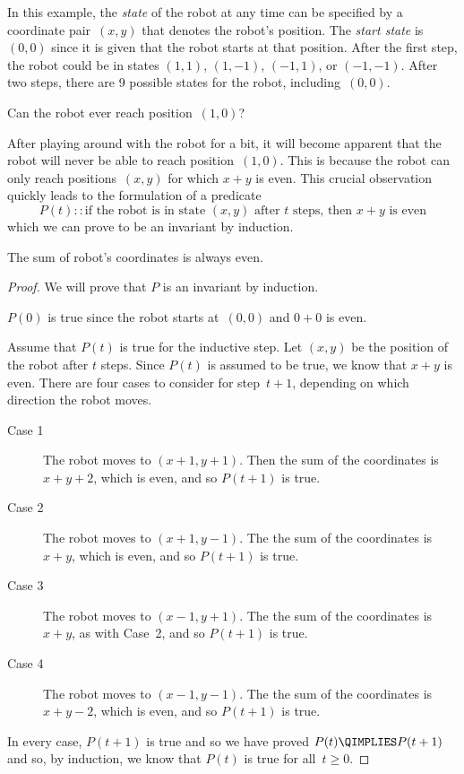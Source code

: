 In this example, the \emph{state} of the robot at any time can be
specified by a coordinate pair~$(x, y)$ that denotes the robot's
position.  The \emph{start state} is~$(0, 0)$ since it is given that
the robot starts at that position.  After the first step, the robot
could be in states $(1, 1)$, $(1, -1)$, $(-1, 1)$, or $(-1, -1)$.
After two steps, there are 9 possible states for the robot,
including~$(0, 0)$.

Can the robot ever reach position~$(1, 0)$?

After playing around with the robot for a bit, it will become apparent
that the robot will never be able to reach position~$(1, 0)$.  This is
because the robot can only reach positions~$(x, y)$ for which $x + y$
is even.  This crucial observation quickly leads to the formulation of
a predicate
\begin{equation*}
    P(t) :: \text{if the robot is in state $(x, y)$ after $t$ steps,
      then $x + y$ is even}
\end{equation*}
which we can prove to be an invariant by induction.

\begin{theorem}\label{th:diag-robot}
The sum of robot's coordinates is always even.
\end{theorem}

\begin{proof}
We will prove that $P$ is an invariant by induction.

$P(0)$ is true since the robot starts at~$(0, 0)$ and $0 + 0$ is even.

Assume that $P(t)$ is true for the inductive step.  Let $(x, y)$ be
the position of the robot after $t$ steps.  Since $P(t)$ is assumed to
be true, we know that $x + y$ is even.  There are four cases to
consider for step~$t + 1$, depending on which direction the robot
moves.
\begin{description}

\item[Case 1]
The robot moves to $(x + 1, y + 1)$.  Then the sum of the coordinates
is $x + y + 2$, which is even, and so $P(t+1)$ is true.

\item[Case 2]
The robot moves to $(x + 1, y - 1)$.  The the sum of the coordinates
is $x + y$, which is even, and so $P(t + 1)$ is true.

\item[Case 3]
The robot moves to $(x - 1, y + 1)$.  The the sum of the coordinates
is $x + y$, as with Case~2, and so $P(t + 1)$ is true.

\item[Case 4]
The robot moves to $(x - 1, y - 1)$.  The the sum of the coordinates
is $x + y - 2$, which is even, and so $P(t + 1)$ is true.

\end{description}
In every case, $P(t + 1)$ is true and so we have proved $P(t)
\QIMPLIES P(t + 1)$ and so, by induction, we know that $P(t)$ is true
for all~$t \ge 0$.
\end{proof}

